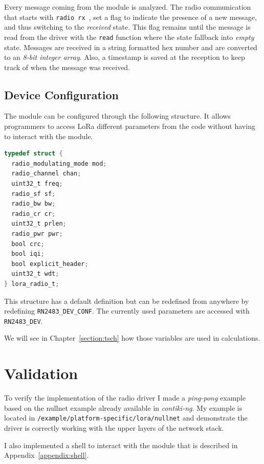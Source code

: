 Every message coming from the module is analyzed.
The radio communication that starts with \lstinline{radio rx }, set a flag to
indicate the presence of a new message, and thus switching to the \emph{received}
state.
This flag remains until the message is read from the driver with the
\lstinline{read} function where the state fallback into \emph{empty} state.
Messages are received in a string formatted hex number and are converted to an
\emph{8-bit integer array}.
Also, a timestamp is saved at the reception to keep track of when the
message was received.



\subsection{Device Configuration}

The module can be configured through the following structure.
It allows programmers to access LoRa different parameters from the code without
having to interact with the module.

\begin{lstlisting}[language=C]
typedef struct {
  radio_modulating_mode mod;
  radio_channel chan;
  uint32_t freq;
  radio_sf sf;
  radio_bw bw;
  radio_cr cr;
  uint32_t prlen;
  radio_pwr pwr;
  bool crc;
  bool iqi;
  bool explicit_header;
  uint32_t wdt;
} lora_radio_t;
\end{lstlisting}

This structure has a default definition but can be redefined from anywhere
by redefining \lstinline{RN2483_DEV_CONF}.
The currently used parameters are accessed with \lstinline{RN2483_DEV}.

We will see in Chapter~\ref{section:tsch} how those variables are used in
calculations.

\section{Validation}

To verify the implementation of the radio driver I made
a \emph{ping-pong} example based on the nullnet example already
available in \emph{contiki-ng}.
My example is located in \lstinline{/example/platform-specific/lora/nullnet}
and demonstrate the driver is correctly working with the upper layers of the
network stack.

I also implemented a shell to interact with the module that is described
in Appendix~\ref{appendix:shell}.

